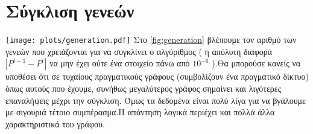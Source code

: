 \noindent
\begin{minipage}{\textwidth}
	\section{Σύγκλιση γενεών}
	\centering
	\texttt{[image: plots/generation.pdf]}
	\label{fig:generation}
           Στο  \hyperref[fig:generation]{\figurename{} \ref{fig:generation}}  βλέπουμε τον αριθμό των γενεών που χρειάζονται για να συγκλίνει ο αλγόριθμος ( η απόλυτη διαφορά $|P^{t+1} - P^t|$ να μην έχει ούτε ένα στοιχείο πάνω από $10^{-6}$ ).Θα μπορούσε κανείς να υποθέσει ότι σε τυχαίους πραγματικούς  γράφους (συμβολίζουν ένα πραγματικό δίκτυο) όπως αυτούς που έχουμε, συνήθως μεγαλύτερος γράφος σημαίνει και λιγότερες επαναλήψεις μέχρι την σύγκλιση. Όμως τα δεδομένα είναι πολύ λίγα για να βγάλουμε με σιγουριά τέτοιο συμπέρασμα.Η απάντηση λογικά περιέχει και πολλά άλλα χαρακτηριστικά του γράφου.
\end{minipage}
